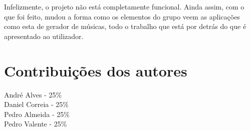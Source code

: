 \documentclass{report}
\begin{document}
	Infelizmente, o projeto não está completamente funcional. Ainda assim, com o que foi feito, mudou a forma como os 
	elementos do grupo veem as aplicações como esta de gerador de músicas, todo o trabalho que está por detrás do que é 
	apresentado ao utilizador.  

 \newpage
\chapter{Contribuições dos autores}
\label{contribuições}

\noindent
André Alves - 25\% \\
Daniel Correia - 25\% \\
Pedro Almeida - 25\% \\
Pedro Valente - 25\% 
\end{document}
